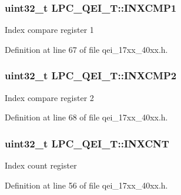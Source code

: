 \subsubsection[{\texorpdfstring{I\+N\+X\+C\+M\+P1}{INXCMP1}}]{ uint32\+\_\+t L\+P\+C\+\_\+\+Q\+E\+I\+\_\+\+T\+::\+I\+N\+X\+C\+M\+P1}\hypertarget{structLPC__QEI__T_a69a6150f42d9c8f9ed52c305c72bd72f}{}\label{structLPC__QEI__T_a69a6150f42d9c8f9ed52c305c72bd72f}
Index compare register 1 

Definition at line 67 of file qei\+\_\+17xx\+\_\+40xx.\+h.

\subsubsection[{\texorpdfstring{I\+N\+X\+C\+M\+P2}{INXCMP2}}]{ uint32\+\_\+t L\+P\+C\+\_\+\+Q\+E\+I\+\_\+\+T\+::\+I\+N\+X\+C\+M\+P2}\hypertarget{structLPC__QEI__T_a19ba8a85129824ec0259b6733baff660}{}\label{structLPC__QEI__T_a19ba8a85129824ec0259b6733baff660}
Index compare register 2 

Definition at line 68 of file qei\+\_\+17xx\+\_\+40xx.\+h.

\subsubsection[{\texorpdfstring{I\+N\+X\+C\+NT}{INXCNT}}]{ uint32\+\_\+t L\+P\+C\+\_\+\+Q\+E\+I\+\_\+\+T\+::\+I\+N\+X\+C\+NT}\hypertarget{structLPC__QEI__T_ae5f756b6037664715b3157f6b6953e42}{}\label{structLPC__QEI__T_ae5f756b6037664715b3157f6b6953e42}
Index count register 

Definition at line 56 of file qei\+\_\+17xx\+\_\+40xx.\+h.

